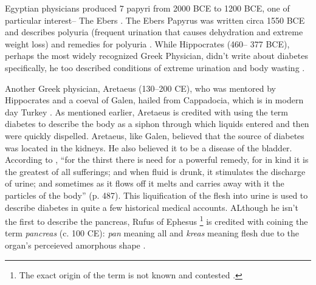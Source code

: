 \documentclass[12pt]{article}
\begin{document}
Egyptian physicians produced 7 papyri from 2000 BCE to 1200 BCE, one of particular interest-- The Ebers \citep{bryan_1974_ancient}. The Ebers Papyrus was written circa 1550 BCE and describes polyuria (frequent urination that causes dehydration and extreme weight loss) and remedies for polyuria \citep{bryan_1974_ancient}. 
While Hippocrates (460-- 377 BCE), perhaps the most widely recognized Greek Physician, didn't write about diabetes specifically, he too described conditions of extreme urination and body wasting \citep{avicenna_1930_treatise}. 

Another Greek physician, Aretaeus (130--200 CE), who was mentored by Hippocrates and a coeval of Galen, hailed from Cappadocia, which is in modern day Turkey \citep{henschen_1969_term}. As mentioned earlier, Aretaeus is credited with using the term diabetes to describe the body as a siphon through which liquids entered and then were quickly dispelled. Aretaeus, like Galen, believed that the source of diabetes was located in the kidneys. He also believed it to be a disease of the bladder. According to \citet{aretaeus_1856_extant},
``for the thirst there is need for a powerful remedy, for in kind it is the greatest of all sufferings; and when fluid is drunk, it stimulates the discharge of urine; and sometimes as it flows off it melts and carries away with it the particles of the body'' (p. 487).  This liquification of the flesh into urine is used to describe diabetes in quite a few historical medical accounts. ALthough he isn't the first to describe the pancreas, Rufus of Ephesus \footnote {The exact origin of the term is not known and contested \citep{sanders_2001_philatelic}.} is credited with coining the term \textit{pancreas} (c. 100 CE): \textit{pan} meaning all and \textit{kreas} meaning flesh due to the organ's perceieved amorphous shape \citep{papaspyros_1964_history}. 
\end{document}

